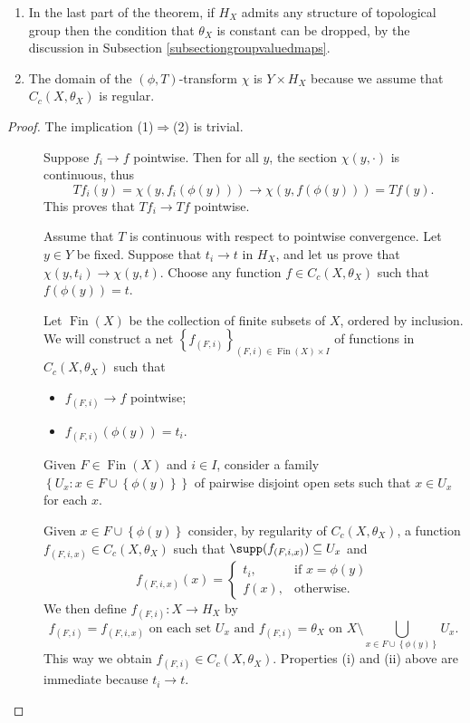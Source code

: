 \begin{remark}
\begin{enumerate}
\item In the last part of the theorem, if $H_X$ admits any structure of topological group then the condition that $\theta_X$ is constant can be dropped, by the discussion in Subsection \ref{subsectiongroupvaluedmaps}.
\item The domain of the $(\phi,T)$-transform $\chi$ is $Y\times H_X$ because we assume that $C_c(X,\theta_X)$ is regular.
\end{enumerate}
\end{remark}

\begin{proof}
The implication (1)$\Rightarrow$(2) is trivial.

\begin{description}
\item[] Suppose $f_i\to f$ pointwise. Then for all $y$, the section $\chi(y,\cdot)$ is continuous, thus
\[Tf_i(y)=\chi(y,f_i(\phi(y)))\to\chi(y,f(\phi(y)))=Tf(y).\]
This proves that $Tf_i\to Tf$ pointwise.
	\item[]Assume that $T$ is continuous with respect to pointwise convergence. Let $y\in Y$ be fixed. Suppose that $t_i\to t$ in $H_X$, and let us prove that $\chi(y,t_i)\to\chi(y,t)$. Choose any function $f\in C_c(X,\theta_X)$ such that $f(\phi(y))=t$.
	
	Let $\operatorname{Fin}(X)$ be the collection of finite subsets of $X$, ordered by inclusion. We will construct a net $\left\{f_{(F,i)}\right\}_{(F,i)\in\operatorname{Fin}(X)\times I}$ of functions in $C_c(X,\theta_X)$ such that
	\begin{itemize}
		\item[(i)] $f_{(F,i)}\to f$ pointwise;
		\item[(ii)] $f_{(F,i)}(\phi(y))=t_i$.
	\end{itemize}
	Given $F\in\operatorname{Fin}(X)$ and $i\in I$, consider a family $\left\{U_x:x\in F\cup\left\{\phi(y)\right\}\right\}$ of pairwise disjoint open sets such that $x\in U_x$ for each $x$.
	
	Given $x\in F\cup\left\{\phi(y)\right\}$ consider, by regularity of $C_c(X,\theta_X)$, a function $f_{(F,i,x)}\in C_c(X,\theta_X)$ such that $\supp(f_{(F,i,x)})\subseteq U_x$ and
	\[f_{(F,i,x)}(x)=\begin{cases}t_i,&\text{if }x=\phi(y)\\
	f(x),&\text{otherwise}.\end{cases}\]
	We then define $f_{(F,i)}:X\to H_X$ by
	\[f_{(F,i)}=f_{(F,i,x)}\text{ on each set }U_x\text{ and }f_{(F,i)}=\theta_X\text{ on }X\setminus\bigcup_{x\in F\cup\left\{\phi(y)\right\}}U_x.\]
	This way we obtain $f_{(F,i)}\in C_c(X,\theta_X)$. Properties (i) and (ii) above are immediate because $t_i\to t$.
	

\end{description}
\end{proof}
